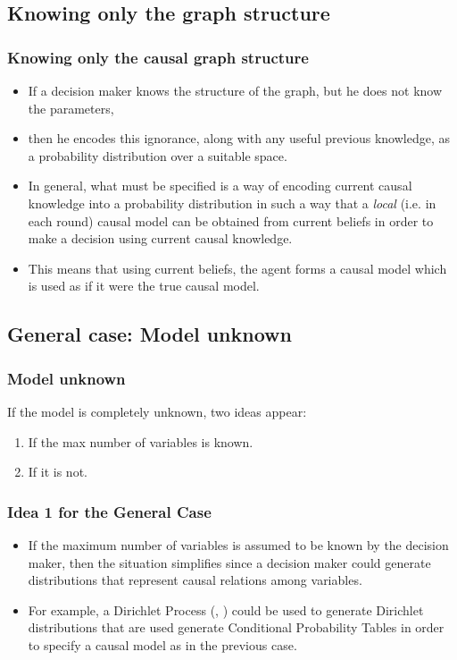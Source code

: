 \documentclass{beamer}
\theoremstyle{plain}
\begin{document}
\subsection{Knowing only the graph structure}
\begin{frame}
\frametitle{Knowing only the causal graph structure}
\begin{itemize}
\item If a decision maker knows the structure of the graph, but he does not know the parameters,
\item then he encodes this ignorance, along with any useful previous knowledge, as a probability distribution over a suitable space.
\item In general, what must be specified is a way of encoding current causal knowledge into a probability distribution in such a way that a \textit{local} (i.e. in each round) causal model can be obtained from current beliefs in order to make a decision using current causal knowledge.
\item This means that using current beliefs, the agent forms a causal model which is used as if it were the true causal model.
\end{itemize}
\end{frame}

\subsection{General case: Model unknown}
\begin{frame}
\frametitle{Model unknown}
If the model is completely unknown, two ideas appear:
\begin{enumerate}
\item If the max number of variables is known.
\item If it is not.
\end{enumerate}
\end{frame}
\begin{frame}
\frametitle{Idea 1 for the General Case}
\begin{itemize}
\item If the maximum number of variables is assumed to be known by the decision maker, then the situation simplifies since a decision maker could generate distributions that represent causal relations among variables.
\item For example, a Dirichlet Process (\cite{ferguson1973bayesian}, \cite{ghosal2017fundamentals}) could be used to generate Dirichlet distributions that are used generate Conditional Probability Tables in order to specify a causal model as in the previous case.
\end{itemize}
\end{frame}
\end{document}

